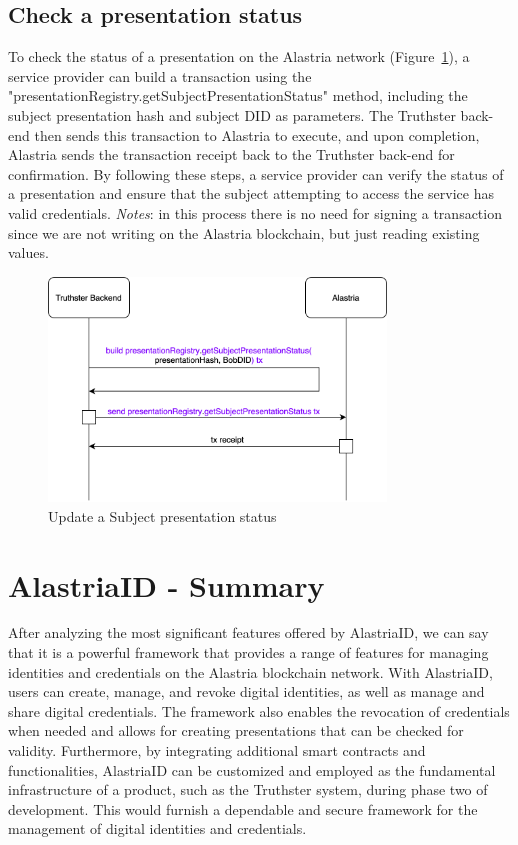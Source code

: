 \documentclass[target=mst,aauheader=]{thud}
\begin{document}
\subsection{Check a presentation status}

To check the status of a presentation on the Alastria network (Figure~\ref{fig:checkSubjectPresentationStatus}), a service provider can build a transaction using the "presentationRegistry.getSubjectPresentationStatus" method, including the subject presentation hash and subject DID as parameters. The Truthster back-end then sends this transaction to Alastria to execute, and upon completion, Alastria sends the transaction receipt back to the Truthster back-end for confirmation. By following these steps, a service provider can verify the status of a presentation and ensure that the subject attempting to access the service has valid credentials.
\textit{Notes}: in this process there is no need for signing a transaction since we are not writing on the Alastria blockchain, but just reading existing values.

\begin{figure}
    \centering
    \includegraphics[width=0.8\textwidth]{images/checkSubjectPresentationStatus.png}
    \caption{Update a Subject presentation status}
    \label{fig:checkSubjectPresentationStatus}
\end{figure}

\section{AlastriaID - Summary}

After analyzing the most significant features offered by AlastriaID, we can say that it is a powerful framework that provides a range of features for managing identities and credentials on the Alastria blockchain network. With AlastriaID, users can create, manage, and revoke digital identities, as well as manage and share digital credentials. 
The framework also enables the revocation of credentials when needed and allows for creating presentations that can be checked for validity. Furthermore, by integrating additional smart contracts and functionalities, AlastriaID can be customized and employed as the fundamental infrastructure of a product, such as the Truthster system, during phase two of development.
This would furnish a dependable and secure framework for the management of digital identities and credentials.
\end{document}
